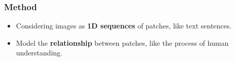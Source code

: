 \documentclass{beamer}
\begin{document}
\begin{frame}
\frametitle{Method}

\begin{figure}
\centering
{}
\hspace*{50pt}
\end{figure}

\begin{itemize}
	\item Considering images as \textbf{1D sequences} of patches, like text sentences.
	\item Model the \textbf{relationship} between patches, like the process of human understanding.
\end{itemize}

\end{frame}
\end{document}
